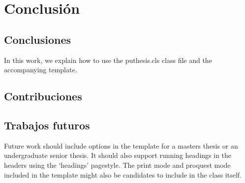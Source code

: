 \chapter{Conclusión\label{ch:conclusion}}

\section{Conclusiones}
In this work, we explain how to use the puthesis.cls class file and the accompanying template.  


\section{Contribuciones}


\section{Trabajos futuros}
Future work should include options in the template for a masters thesis or an undergraduate senior thesis. It should also support running headings in the headers using the `headings' pagestyle.  The print mode and proquest mode included in the template might also be candidates to include in the class itself. 